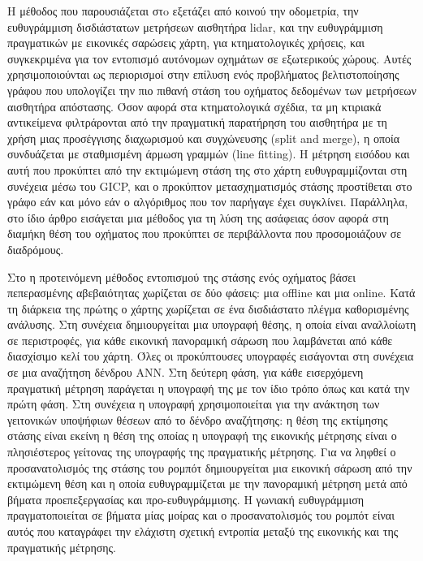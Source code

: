 Η μέθοδος που παρουσιάζεται στo \cite{Bresson2019a} εξετάζει από κοινού την
οδομετρία, την ευθυγράμμιση δισδιάστατων μετρήσεων αισθητήρα lidar, και την
ευθυγράμμιση πραγματικών με εικονικές σαρώσεις χάρτη, για κτηματολογικές
χρήσεις, και συγκεκριμένα για τον εντοπισμό αυτόνομων οχημάτων σε εξωτερικούς
χώρους. Αυτές χρησιμοποιούνται ως περιορισμοί στην επίλυση ενός προβλήματος
βελτιστοποίησης γράφου που υπολογίζει την πιο πιθανή στάση του οχήματος
δεδομένων των μετρήσεων αισθητήρα απόστασης. Όσον αφορά στα κτηματολογικά
σχέδια, τα μη κτιριακά αντικείμενα φιλτράρονται από την πραγματική παρατήρηση
του αισθητήρα με τη χρήση μιας προσέγγισης διαχωρισμού και συγχώνευσης (split
and merge), η οποία συνδυάζεται με σταθμισμένη άρμωση γραμμών (line fitting). Η
μέτρηση εισόδου και αυτή που προκύπτει από την εκτιμώμενη στάση της στο χάρτη
ευθυγραμμίζονται στη συνέχεια μέσω του GICP, και ο προκύπτον μετασχηματισμός
στάσης προστίθεται στο γράφο εάν και μόνο εάν ο αλγόριθμος που τον παρήγαγε
έχει συγκλίνει. Παράλληλα, στο ίδιο άρθρο εισάγεται μια μέθοδος για τη λύση της
ασάφειας όσον αφορά στη διαμήκη θέση του οχήματος που προκύπτει σε περιβάλλοντα
που προσομοιάζουν σε διαδρόμους.

Στο \cite{Wang2021a} η προτεινόμενη μέθοδος εντοπισμού της στάσης ενός
οχήματος βάσει πεπερασμένης αβεβαιότητας χωρίζεται σε δύο φάσεις: μια offline
και μια online. Κατά τη διάρκεια της πρώτης ο χάρτης χωρίζεται σε ένα
δισδιάστατο πλέγμα καθορισμένης ανάλυσης. Στη συνέχεια δημιουργείται μια
υπογραφή θέσης, η οποία είναι αναλλοίωτη σε περιστροφές, για κάθε εικονική
πανοραμική σάρωση που λαμβάνεται από κάθε διασχίσιμο κελί του χάρτη. Όλες οι
προκύπτουσες υπογραφές εισάγονται στη συνέχεια σε μια αναζήτηση δένδρου ANN.
Στη δεύτερη φάση, για κάθε εισερχόμενη πραγματική μέτρηση παράγεται η υπογραφή
της με τον ίδιο τρόπο όπως και κατά την πρώτη φάση. Στη συνέχεια η υπογραφή
χρησιμοποιείται για την ανάκτηση των γειτονικών υποψήφιων θέσεων από το δένδρο
αναζήτησης: η θέση της εκτίμησης στάσης είναι εκείνη η θέση της οποίας η
υπογραφή της εικονικής μέτρησης είναι ο πλησιέστερος γείτονας της υπογραφής της
πραγματικής μέτρησης.  Για να ληφθεί ο προσανατολισμός της στάσης του ρομπότ
δημιουργείται μια εικονική σάρωση από την εκτιμώμενη θέση και η οποία
ευθυγραμμίζεται με την πανοραμική μέτρηση μετά από βήματα προεπεξεργασίας και
προ-ευθυγράμμισης. Η γωνιακή ευθυγράμμιση πραγματοποιείται σε βήματα μίας
μοίρας και ο προσανατολισμός του ρομπότ είναι αυτός που καταγράφει την ελάχιστη
σχετική εντροπία μεταξύ της εικονικής και της πραγματικής μέτρησης.
